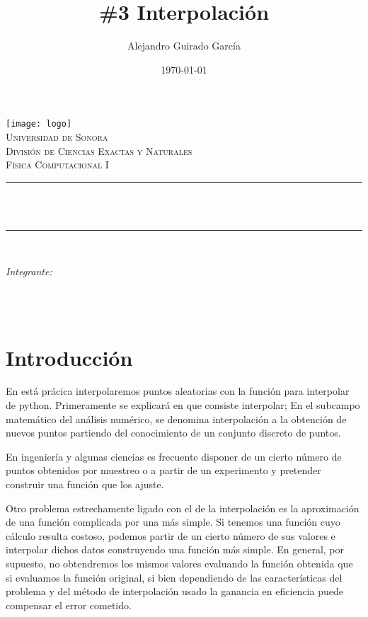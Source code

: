 \documentclass[12pt]{article}
\title{\#3 Interpolación}							%
\author{Alejandro Guirado García}											%
\date{\today} %
\makeatletter
\let\thetitle\@title
\let\theauthor\@author
\let\thedate\@date
\makeatother
\begin{document}

\begin{titlepage}
	\centering
    \vspace*{0.5 cm}
    \texttt{[image: logo]}\\[0.5 cm]	%
    \textsc{\Large Universidad de Sonora}\\[1.0 cm]	%
	\textsc{\Large División de Ciencias Exactas y Naturales}\\[0.5 cm]				%
	\textsc{\large Física Computacional I}\\[0.5 cm]				%
	\rule{\linewidth}{0.2 mm} \\[0.4 cm]
	{ \huge \bfseries \thetitle}\\
	\rule{\linewidth}{0.2 mm} \\[0.5 cm]
 
	
	\begin{minipage}{\textwidth}
		\begin{flushleft} 
			\emph{\Large Integrante:} \large \\
			\theauthor
			\end{flushleft}
	\end{minipage}\\[1 cm]
	{\large \thedate}\\[2 cm]
 
	\vfill
	
\end{titlepage}


\section{Introducción}

En está prácica interpolaremos puntos aleatorias con la función para interpolar de python.  Primeramente se explicará en que consiste interpolar; En el subcampo matemático del análisis numérico, se denomina interpolación a la obtención de nuevos puntos partiendo del conocimiento de un conjunto discreto de puntos.

En ingeniería y algunas ciencias es frecuente disponer de un cierto número de puntos obtenidos por muestreo o a partir de un experimento y pretender construir una función que los ajuste.

Otro problema estrechamente ligado con el de la interpolación es la aproximación de una función complicada por una más simple. Si tenemos una función cuyo cálculo resulta costoso, podemos partir de un cierto número de sus valores e interpolar dichos datos construyendo una función más simple. En general, por supuesto, no obtendremos los mismos valores evaluando la función obtenida que si evaluamos la función original, si bien dependiendo de las características del problema y del método de interpolación usado la ganancia en eficiencia puede compensar el error cometido.
\end{document}
